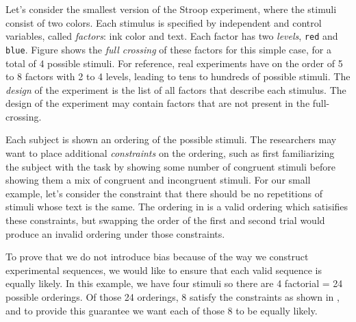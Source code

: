 Let's consider the smallest version of the Stroop experiment, where the stimuli consist of two colors. Each stimulus is specified by independent and control variables, called \emph{factors}: ink color and text. Each factor has two \emph{levels}, \texttt{red} and \texttt{blue}. Figure  shows the \emph{full crossing} of these factors for this simple case, for a total of 4 possible stimuli. For reference, real experiments have on the order of 5 to 8 factors with 2 to 4 levels, leading to tens to hundreds of possible stimuli. The \emph{design} of the experiment is the list of all factors that describe each stimulus. The design of the experiment may contain factors that are not present in the full-crossing.

Each subject is shown an ordering of the possible stimuli. The researchers may want to place additional \emph{constraints} on the ordering, such as first familiarizing the subject with the task by showing some number of congruent stimuli before showing them a mix of congruent and incongruent stimuli. For our small example, let's consider the constraint that there should be no repetitions of stimuli whose text is the same. The ordering in  is a valid ordering which satisifies these constraints, but swapping the order of the first and second trial would produce an invalid ordering under those constraints.

To prove that we do not introduce bias because of the way we construct experimental sequences, we would like to ensure that each valid sequence is equally likely. In this example, we have four stimuli so there are 4 factorial = 24 possible orderings. Of those 24 orderings, 8 satisfy the constraints as shown in , and to provide this guarantee we want each of those 8 to be equally likely.



